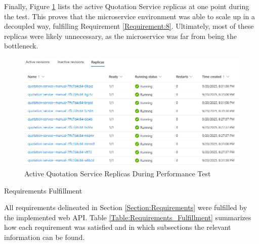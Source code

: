 \documentclass[12pt, reqno]{amsbook}
\makeatletter
\def\section{\@startsection{section}{1}%
      \z@{.5\linespacing\@plus.7\linespacing}{.25\linespacing}%
      {\normalfont\bfseries\flushleft}}
\theoremstyle{definition}
\theoremstyle{definition}
\numberwithin{section}{chapter}
\numberwithin{table}{chapter}
\numberwithin{figure}{chapter}
\makeatother
\begin{document}
Finally, Figure \ref{Figure:LoadTestingActiveReplicas} lists the active Quotation Service replicas at one point during the test. This proves that the microservice environment was able to scale up in a decoupled way, fulfilling Requirement \ref{Requirement:8}. Ultimately, most of these replicas were likely unnecessary, as the microservice was far from being the bottleneck.

\begin{figure}[H]
  \centering
  \includegraphics[width=1\linewidth]{images/LoadTestingActiveReplicas.png}
  \caption{\label{Figure:LoadTestingActiveReplicas}Active Quotation Service Replicas During Performance Test}
\end{figure}

\section{Requirements Fulfillment}
\label{Section:Requirements_Fulfillment}

All requirements delineated in Section \ref{Section:Requirements} were fulfilled by the implemented web \ac{API}. Table \ref{Table:Requirements_Fulfillment} summarizes how each requirement was satisfied and in which subsections the relevant information can be found.
\end{document}
